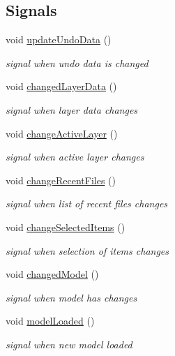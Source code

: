 \subsection*{Signals}
\begin{DoxyCompactItemize}
\item 
void \hyperlink{classShipCAD_1_1Controller_ade17d53952bf5a977dfec2e68f4fffb9}{update\-Undo\-Data} ()
\begin{DoxyCompactList}\small\item\em signal when undo data is changed \end{DoxyCompactList}\item 
void \hyperlink{classShipCAD_1_1Controller_a57eb4873ebd9c7849ed0487a75c3f40a}{changed\-Layer\-Data} ()
\begin{DoxyCompactList}\small\item\em signal when layer data changes \end{DoxyCompactList}\item 
void \hyperlink{classShipCAD_1_1Controller_aea2802b3826e7b6f7d5eae78db07f7e0}{change\-Active\-Layer} ()
\begin{DoxyCompactList}\small\item\em signal when active layer changes \end{DoxyCompactList}\item 
void \hyperlink{classShipCAD_1_1Controller_ae32527d0bde7189e5e2bf811d81bab46}{change\-Recent\-Files} ()
\begin{DoxyCompactList}\small\item\em signal when list of recent files changes \end{DoxyCompactList}\item 
void \hyperlink{classShipCAD_1_1Controller_ae28eabc4c698e3bc8732a004d2ab4034}{change\-Selected\-Items} ()
\begin{DoxyCompactList}\small\item\em signal when selection of items changes \end{DoxyCompactList}\item 
void \hyperlink{classShipCAD_1_1Controller_a3418d01b682177521f463bc6fdb7d802}{changed\-Model} ()
\begin{DoxyCompactList}\small\item\em signal when model has changes \end{DoxyCompactList}\item 
void \hyperlink{classShipCAD_1_1Controller_a61d8a1d0d26a123ef81527ba32932bd2}{model\-Loaded} ()
\begin{DoxyCompactList}\small\item\em signal when new model loaded \end{DoxyCompactList}\item 

\end{DoxyCompactItemize}
